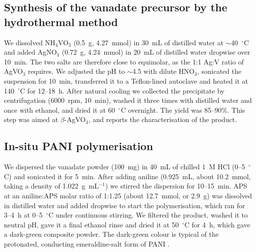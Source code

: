 \documentclass[preprint,11pt]{elsarticle}
\begin{document}
\subsection{Synthesis of the vanadate precursor by the hydrothermal method}
\label{sec:synth-vanadate}
We dissolved NH$_4$VO$_3$ (0.5~g, 4.27~mmol) in 30~mL of distilled water at $\sim$40~$^{\circ}$C and added AgNO$_3$ (0.72~g, 4.24~mmol) in 20~mL of distilled water dropwise over 10~min. The two salts are therefore close to equimolar, as the 1:1 Ag:V ratio of AgVO$_3$ requires. We adjusted the pH to $\sim$4.5 with dilute HNO$_3$, sonicated the suspension for 10~min, transferred it to a Teflon-lined autoclave and heated it at 140~$^{\circ}$C for 12--18~h. After natural cooling we collected the precipitate by centrifugation (6000~rpm, 10~min), washed it three times with distilled water and once with ethanol, and dried it at 60~$^{\circ}$C overnight. The yield was 85--90\%. This step was aimed at $\beta$-AgVO$_3$, and  reports the characterisation of the product.

\subsection{In-situ PANI polymerisation}
\label{sec:synth-pani}
We dispersed the vanadate powder (100~mg) in 40~mL of chilled 1~M HCl (0--5~$^{\circ}$C) and sonicated it for 5~min. After adding aniline (0.925~mL, about 10.2~mmol, taking a density of 1.022~g~mL$^{-1}$) we stirred the dispersion for 10--15~min. APS at an aniline:APS molar ratio of 1:1.25 (about 12.7~mmol, or 2.9~g) was dissolved in distilled water and added dropwise to start the polymerisation, which ran for 3--4~h at 0--5~$^{\circ}$C under continuous stirring. We filtered the product, washed it to neutral pH, gave it a final ethanol rinse and dried it at 50~$^{\circ}$C for 4~h, which gave a dark-green composite powder. The dark-green colour is typical of the protonated, conducting emeraldine-salt form of PANI \cite{yang2023panisensors}.
\end{document}
